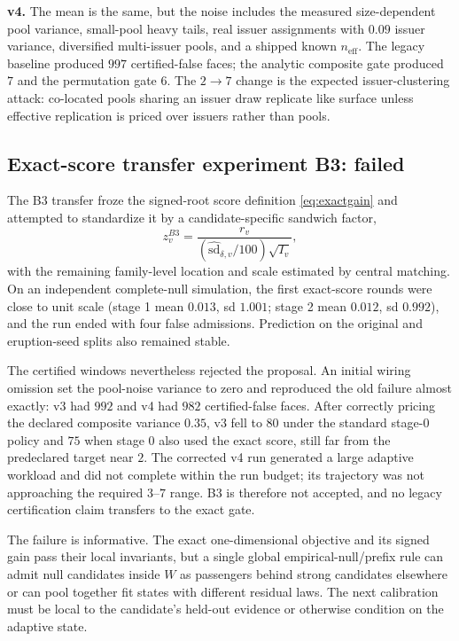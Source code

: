 \documentclass[11pt]{article}
\begin{document}
\textbf{v4.} The mean is the same, but the noise includes the measured size-dependent pool variance,
small-pool heavy tails, real issuer assignments with $0.09$ issuer variance, diversified
multi-issuer pools, and a shipped known $n_{\mathrm{eff}}$. The legacy baseline produced $997$
certified-false faces; the analytic composite gate produced $7$ and the permutation gate $6$. The
$2\to7$ change is the expected issuer-clustering attack: co-located pools sharing an issuer draw
replicate like surface unless effective replication is priced over issuers rather than pools.

\subsection*{Exact-score transfer experiment B3: failed}
The B3 transfer froze the signed-root score definition \eqref{eq:exactgain} and attempted to
standardize it by a candidate-specific sandwich factor,
\begin{equation}\label{eq:b3score}
z_v^{B3}=\frac{r_v}{(\widehat{\mathrm{sd}}_{\delta,v}/100)\sqrt{I_v}},
\end{equation}
with the remaining family-level location and scale estimated by central matching. On an independent
complete-null simulation, the first exact-score rounds were close to unit scale (stage 1 mean
$0.013$, sd $1.001$; stage 2 mean $0.012$, sd $0.992$), and the run ended with four false
admissions. Prediction on the original and eruption-seed splits also remained stable.

The certified windows nevertheless rejected the proposal. An initial wiring omission set the
pool-noise variance to zero and reproduced the old failure almost exactly: v3 had $992$ and v4 had
$982$ certified-false faces. After correctly pricing the declared composite variance $0.35$, v3 fell
to $80$ under the standard stage-0 policy and $75$ when stage 0 also used the exact score, still far
from the predeclared target near $2$. The corrected v4 run generated a large adaptive workload and
did not complete within the run budget; its trajectory was not approaching the required $3$--$7$
range. B3 is therefore not accepted, and no legacy certification claim transfers to the exact gate.

The failure is informative. The exact one-dimensional objective and its signed gain pass their local
invariants, but a single global empirical-null/prefix rule can admit null candidates inside $W$ as
passengers behind strong candidates elsewhere or can pool together fit states with different residual
laws. The next calibration must be local to the candidate's held-out evidence or otherwise condition
on the adaptive state.
\end{document}
